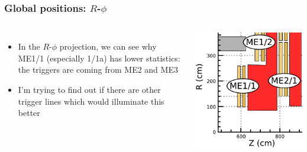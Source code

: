 \documentclass[compress]{beamer}
\begin{document}
\begin{frame}
\frametitle{Global positions: $R$-$\phi$}
\vspace{-0.75 cm}
\begin{columns}
\vspace{0.5 cm}
\begin{itemize}
\item In the $R$-$\phi$ projection, we can see why ME1/1 (especially
  1/1a) has lower statistics: the triggers are coming from ME2 and ME3
\item I'm trying to find out if there are other trigger lines which would
  illuminate this better
\end{itemize}

\includegraphics[width=\linewidth]{geometry_me1_me2.pdf}
\end{columns}


\end{frame}
\end{document}
